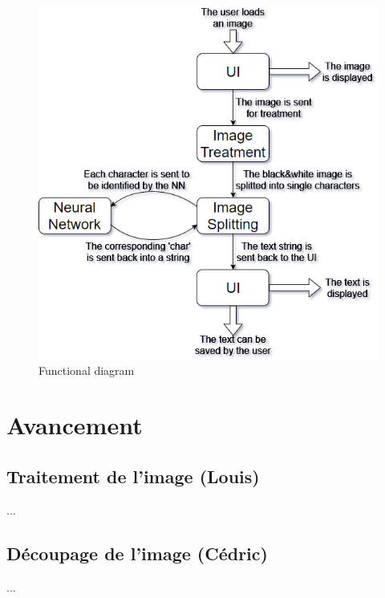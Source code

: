 \documentclass[12pt]{report}
\begin{document}
\begin{figure}[H]
    \centering
    \includegraphics[width=1\textwidth]{OCR_functionnal_diagram}
    \caption{Functional diagram}
\end{figure}

\chapter{Avancement}

\section{Traitement de l'image (Louis)}

...

\section{Découpage de l'image (Cédric)}

...

\end{document}
